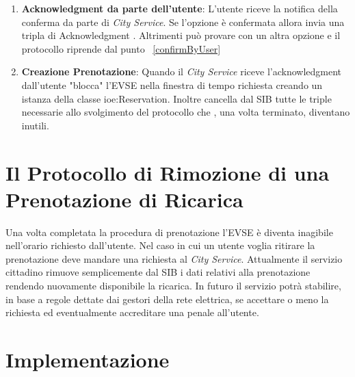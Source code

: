 \begin{enumerate}[label=\textbf{\arabic*}]
	\\ . 
	\item \textbf{Acknowledgment da parte dell'utente}: L'utente riceve la notifica della conferma da parte di \emph{City Service}. Se l'opzione è confermata allora invia una tripla di Acknowledgment . Altrimenti può provare con un altra opzione e il protocollo riprende dal punto ~\ref{confirmByUser}
	\item \textbf{Creazione Prenotazione}: Quando il \emph{City Service} riceve l'acknowledgment dall'utente "blocca" l'EVSE nella finestra di tempo richiesta creando un istanza della classe {ioe:Reservation}. Inoltre cancella dal SIB tutte le triple necessarie allo svolgimento del protocollo che  , una volta terminato, diventano inutili.
\end{enumerate}

\section{Il Protocollo di Rimozione di una Prenotazione di Ricarica}

Una volta completata la procedura di prenotazione l'EVSE è diventa inagibile nell'orario richiesto dall'utente. Nel caso in cui un utente voglia ritirare la prenotazione deve mandare una richiesta al \emph{City Service}. Attualmente il servizio cittadino rimuove semplicemente dal SIB i dati relativi alla prenotazione rendendo nuovamente disponibile la ricarica. In futuro il servizio potrà stabilire, in base a regole dettate dai gestori della rete elettrica, se accettare o meno la richiesta ed eventualmente accreditare una penale all'utente.

\section{Implementazione}








